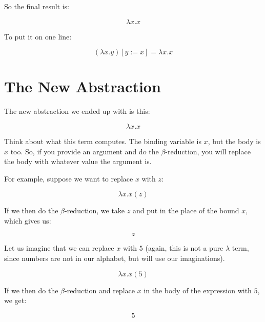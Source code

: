 \documentclass{book}
\numberwithin{equation}{chapter}
\begin{document}
\noindent
So the final result is:

\begin{equation}
\lambda x.x
\end{equation}

\noindent
To put it on one line:

\begin{equation}
(\lambda x.y)[y := x] = \lambda x.x
\end{equation}


\section{The New Abstraction}

The new abstraction we ended up with is this:

\begin{equation}
\lambda x.x
\end{equation}

\noindent
Think about what this term computes. The binding variable is $x$, but the body is $x$ too. So, if you provide an argument and do the $\beta$-reduction, you will replace the body with whatever value the argument is.

For example, suppose we want to replace $x$ with $z$:

\begin{equation}
\lambda x.x (z)
\end{equation}

\noindent
If we then do the $\beta$-reduction, we take $z$ and put in the place of the bound $x$, which gives us:

\begin{equation}
z
\end{equation}

\noindent
Let us imagine that we can replace $x$ with $5$ (again, this is not a pure $\lambda$ term, since numbers are not in our alphabet, but will use our imaginations).

\begin{equation}
\lambda x.x (5)
\end{equation}

\noindent
If we then do the $\beta$-reduction and replace $x$ in the body of the expression with $5$, we get:

\begin{equation}
5
\end{equation}
\end{document}
